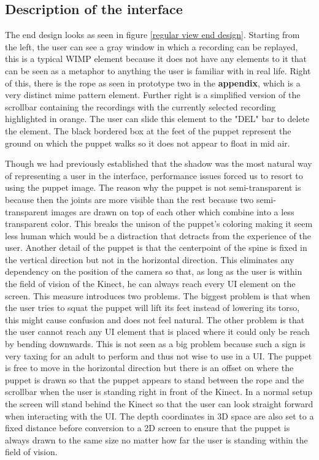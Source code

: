 
\subsection{Description of the interface}

The end design looks as seen in figure \ref{regular view end design}. Starting from the left, the user can see a gray window in which a recording can be replayed, this is a typical WIMP element because it does not have any elements to it that can be seen as a metaphor to anything the user is familiar with in real life. Right of this, there is the rope as seen in prototype two in the \textbf{ appendix}, which is a very distinct mime pattern element. Further right is a simplified version of the scrollbar containing the recordings with the currently selected recording highlighted in orange. The user can slide this element to the "DEL" bar to delete the element. The black bordered box at the feet of the puppet represent the ground on which the puppet walks so it does not appear to float in mid air.

Though we had previously established that the shadow was the most natural way of representing a user in the interface, performance issues forced us to resort to using the puppet image. The reason why the puppet is not semi-transparent is because then the joints are  more visible than the rest because two semi-transparent images are drawn on top of each other which combine into a less transparent color. This breaks the unison of the puppet's coloring making it seem less human which would be a distraction that detracts from the experience of the user. Another detail of the puppet is that the centerpoint of the spine is fixed in the vertical direction but not in the horizontal direction. This eliminates any dependency on the position of the camera so that, as long as the user is within the field of vision of the Kinect, he can always reach every UI element on the screen. This measure introduces two  problems. The biggest problem is that when the user tries to squat the puppet will lift its feet instead of lowering its torso, this might cause confusion and does not feel natural. The other problem is that the user cannot reach any UI element that is placed where it could only be reach by bending downwards. This is not seen as a big problem because such a sign is very taxing for an adult to perform and thus not wise to use in a UI. The puppet is free to move in the horizontal direction but there is an offset on where the puppet is drawn so that the puppet appears to stand between the rope and the scrollbar when the user is standing right in front of the Kinect. In a normal setup the screen will stand behind the Kinect so that the user can look straight forward when interacting with the UI. The depth coordinates in 3D space are also set to a fixed distance before conversion to a 2D screen to ensure that the puppet is always drawn to the same size no matter how far the user is standing within the field of vision.\\

